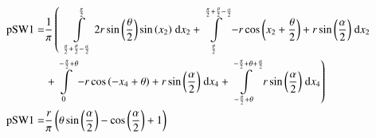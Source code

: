 \begin{align}
    \mathrm{pSW1} =&\frac{1}{\pi} \left(\;\;\int\limits_{\frac{\pi}{2} + \frac{\theta}{2} - \frac{\alpha}{2}}^{\frac{\pi}{2}}2 r \sin{\left (\frac{\theta}{2} \right )} \sin{\left (x_{2} \right )}\;\mathrm{d}x_{2}+\int\limits_{\frac{\theta}{2}}^{\frac{\pi}{2} + \frac{\theta}{2} - \frac{\alpha}{2}}- r \cos{\left (x_{2} + \frac{\theta}{2} \right )} + r \sin{\left (\frac{\alpha}{2} \right )}\;\mathrm{d}x_{2}\right.\notag\\
 &\left.+\int\limits_{0}^{- \frac{\pi}{2} + \theta}- r \cos{\left (- x_{4} + \theta \right )} + r \sin{\left (\frac{\alpha}{2} \right )}\;\mathrm{d}x_{4}+\int\limits_{- \frac{\pi}{2} + \theta}^{- \frac{\pi}{2} + \theta + \frac{\alpha}{2}}r \sin{\left (\frac{\alpha}{2} \right )}\;\mathrm{d}x_{4}\right)\label{pSW1Def}\\
    \mathrm{pSW1} =& \frac{r}{\pi} \left(\theta \sin{\left (\frac{\alpha}{2} \right )} - \cos{\left (\frac{\alpha}{2} \right )} + 1\right)\label{pSW1Sln}
\end{align}